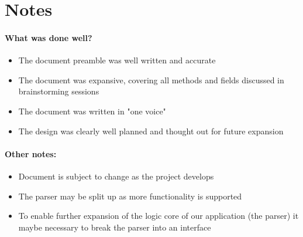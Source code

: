 \documentclass{article}
\begin{document}
\section{Notes}
    
\paragraph{What was done well?}
\begin{itemize}
    \item The document preamble was well written and accurate
    \item The document was expansive, covering all methods and fields discussed in brainstorming sessions
    \item The document was written in "one voice"
    \item The design was clearly well planned and thought out for future expansion
\end{itemize}

\paragraph{Other notes:}
\begin{itemize}
    \item Document is subject to change as the project develops
    \item The parser may be split up as more functionality is supported
    \item To enable further expansion of the logic core of our application (the parser) it maybe necessary to break the parser into an interface
\end{itemize}
\end{document}
